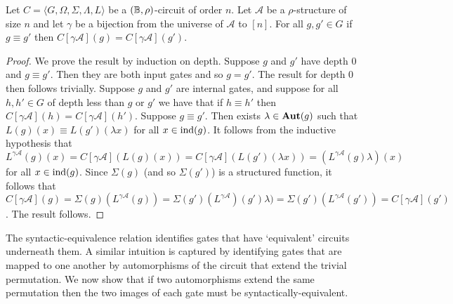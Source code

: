 \documentclass[../main/thesis.tex]{subfiles}
\begin{document}
\begin{lem}
  Let $C = \langle G, \Omega, \Sigma, \Lambda, L \rangle$ be a $(\mathbb{B},
  \rho)$-circuit of order $n$. Let $\mathcal{A}$ be a $\rho$-structure of size
  $n$ and let $\gamma$ be a bijection from the universe of $\mathcal{A}$ to
  $[n]$. For all $g, g' \in G$ if $g \equiv g'$ then $C[\gamma \mathcal{A}](g) =
  C[\gamma \mathcal{A}](g')$.
  \label{lem:syntactic-equivalence-equal-function}
\end{lem}
\begin{proof}
  We prove the result by induction on depth. Suppose $g$ and $g'$ have depth $0$
  and $g \equiv g'$. Then they are both input gates and so $g = g'$. The result
  for depth $0$ then follows trivially. Suppose $g$ and $g'$ are internal gates,
  and suppose for all $h, h' \in G$ of depth less than $g$ or $g'$ we have that
  if $h \equiv h'$ then $C[\gamma \mathcal{A}](h) = C[\gamma \mathcal{A}](h')$.
  Suppose $g \equiv g'$. Then exists $\lambda \in \text{\textbf{Aut}}(g)$ such that $L(g) (x)
  \equiv L(g') (\lambda x)$ for all $x \in \text{\upshape ind}(g)$. It follows from the
  inductive hypothesis that $L^{\gamma \mathcal{A}}(g)(x) = C[\gamma
  \mathcal{A}](L(g)(x)) = C[\gamma \mathcal{A}](L(g')(\lambda x)) = (L^{\gamma
    \mathcal{A}}(g) \lambda) (x)$ for all $x \in \text{\upshape ind}(g)$. Since $\Sigma(g)$
  (and so $\Sigma(g')$) is a structured function, it follows that $C[\gamma
  \mathcal{A}](g) = \Sigma(g)(L^{\gamma \mathcal{A}} (g)) = \Sigma(g')
  (L^{\gamma \mathcal{A}})(g') \lambda) = \Sigma(g') (L^{\gamma
    \mathcal{A}}(g')) = C[\gamma \mathcal{A}](g')$. The result follows.
\end{proof}

The syntactic-equivalence relation identifies gates that have `equivalent'
circuits underneath them. A similar intuition is captured by identifying gates
that are mapped to one another by automorphisms of the circuit that extend the
trivial permutation. We now show that if two automorphisms extend the same
permutation then the two images of each gate must be syntactically-equivalent.
\end{document}
